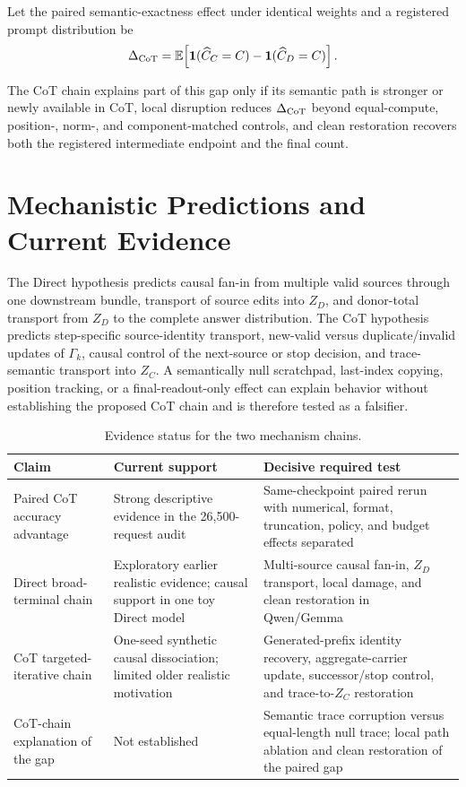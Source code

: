 \documentclass[11pt]{article}
\newcommand{\E}{\mathbb{E}}
\begin{document}
Let the paired semantic-exactness effect under identical weights and a registered prompt distribution be
\begin{equation}
\Delta_{\rm CoT}=\E\!\left[
\mathbf 1(\widehat C_C=C)-\mathbf 1(\widehat C_D=C)
\right].
\label{eq:cot-benefit}
\end{equation}

The CoT chain explains part of this gap only if its semantic path is stronger or newly available in CoT, local disruption reduces $\Delta_{\rm CoT}$ beyond equal-compute, position-, norm-, and component-matched controls, and clean restoration recovers both the registered intermediate endpoint and the final count.

\section{Mechanistic Predictions and Current Evidence}
\label{sec:hypotheses}

The Direct hypothesis predicts causal fan-in from multiple valid sources through one downstream bundle, transport of source edits into $Z_D$, and donor-total transport from $Z_D$ to the complete answer distribution. The CoT hypothesis predicts step-specific source-identity transport, new-valid versus duplicate/invalid updates of $\Gamma_k$, causal control of the next-source or stop decision, and trace-semantic transport into $Z_C$. A semantically null scratchpad, last-index copying, position tracking, or a final-readout-only effect can explain behavior without establishing the proposed CoT chain and is therefore tested as a falsifier.

\begin{table}[H]
\centering
\small
\caption{Evidence status for the two mechanism chains.}
\label{tab:claim-status}
\begin{tabularx}{\textwidth}{@{}P{.22\textwidth}Y P{.27\textwidth}@{}}
\toprule
Claim & Current support & Decisive required test \\
\midrule
Paired CoT accuracy advantage & Strong descriptive evidence in the 26,500-request audit & Same-checkpoint paired rerun with numerical, format, truncation, policy, and budget effects separated \\
Direct broad-terminal chain & Exploratory earlier realistic evidence; causal support in one toy Direct model & Multi-source causal fan-in, $Z_D$ transport, local damage, and clean restoration in Qwen/Gemma \\
CoT targeted-iterative chain & One-seed synthetic causal dissociation; limited older realistic motivation & Generated-prefix identity recovery, aggregate-carrier update, successor/stop control, and trace-to-$Z_C$ restoration \\
CoT-chain explanation of the gap & Not established & Semantic trace corruption versus equal-length null trace; local path ablation and clean restoration of the paired gap \\
\bottomrule
\end{tabularx}
\end{table}
\end{document}
